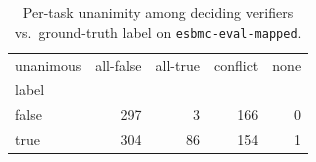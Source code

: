 \begin{table}[t]
  \centering
  \caption{Per-task unanimity among deciding verifiers vs.\ ground-truth label on \texttt{esbmc-eval-mapped}.}
  \label{tab:unanimous-esbmc-eval-mapped}
\begin{tabular}{lrrrr}
\toprule
unanimous & all-false & all-true & conflict & none \\
label &  &  &  &  \\
\midrule
false & 297 & 3 & 166 & 0 \\
true & 304 & 86 & 154 & 1 \\
\bottomrule
\end{tabular}
\end{table}
